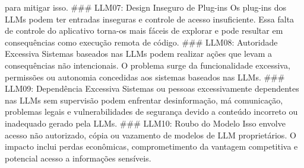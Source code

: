 \documentclass[
]{article}
\begin{document}
para mitigar isso. \#\#\# LLM07: Design Inseguro de Plug-ins Os plug-ins
dos LLMs podem ter entradas inseguras e controle de acesso insuficiente.
Essa falta de controle do aplicativo torna-os mais fáceis de explorar e
pode resultar em consequências como execução remota de código. \#\#\#
LLM08: Autoridade Excessiva Sistemas baseados nas LLMs podem realizar
ações que levam a consequências não intencionais. O problema surge da
funcionalidade excessiva, permissões ou autonomia concedidas aos
sistemas baseados nas LLMs. \#\#\# LLM09: Dependência Excessiva Sistemas
ou pessoas excessivamente dependentes nas LLMs sem supervisão podem
enfrentar desinformação, má comunicação, problemas legais e
vulnerabilidades de segurança devido a conteúdo incorreto ou inadequado
gerado pela LLMs. \#\#\# LLM10: Roubo do Modelo Isso envolve acesso não
autorizado, cópia ou vazamento de modelos de LLM proprietários. O
impacto inclui perdas econômicas, comprometimento da vantagem
competitiva e potencial acesso a informações sensíveis.
\end{document}
